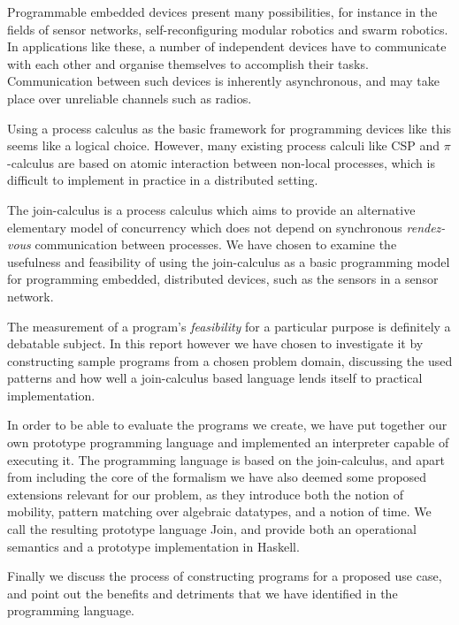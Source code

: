 
Programmable embedded devices present many possibilities, for instance in the
fields of sensor networks, self-reconfiguring modular robotics and swarm
robotics. In applications like these, a number of independent devices have to
communicate with each other and organise themselves to accomplish their tasks.
Communication between such devices is inherently asynchronous, and may take
place over unreliable channels such as radios.

Using a process calculus as the basic framework for programming devices like
this seems like a logical choice. However, many existing process calculi like
CSP\cite{hoare-csp} and $\pi$-calculus\cite{milner-pi} are based on atomic
interaction between non-local processes, which is difficult to implement in
practice in a distributed setting.

The join-calculus\cite{fournet1996reflexive} is a process calculus which aims to
provide an alternative elementary model of concurrency which does not depend on
synchronous \emph{rendez-vous} communication between processes. We have chosen
to examine the usefulness and feasibility of using the join-calculus as a
basic programming model for programming embedded, distributed devices, such as
the sensors in a sensor network.

The measurement of a program's \emph{feasibility} for a particular purpose is
definitely a debatable subject. In this report however we have chosen to
investigate it by constructing sample programs from a chosen problem domain,
discussing the used patterns and how well a join-calculus based language lends
itself to practical implementation.

In order to be able to evaluate the programs we create, we have put together our
own prototype programming language and implemented an interpreter capable of
executing it. The programming language is based on the join-calculus, and apart
from including the core of the formalism we have also deemed some proposed
extensions relevant for our problem, as they introduce both the notion of
mobility, pattern matching over algebraic datatypes, and a notion of time. We
call the resulting prototype language Join, and provide both an operational
semantics and a prototype implementation in Haskell.

Finally we discuss the process of constructing programs for a proposed use case,
and point out the benefits and detriments that we have identified in the
programming language.
